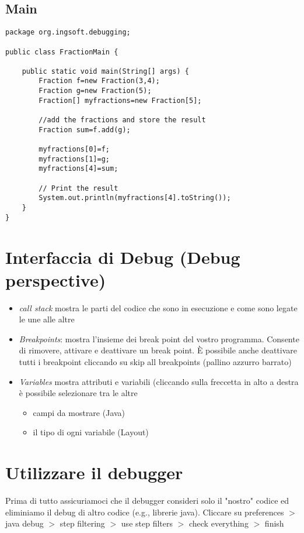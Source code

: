 \documentclass{article}
\begin{document}
\subsection{Main}
\begin{lstlisting}
package org.ingsoft.debugging;

public class FractionMain {

	public static void main(String[] args) {
		Fraction f=new Fraction(3,4);
		Fraction g=new Fraction(5);
		Fraction[] myfractions=new Fraction[5];
		
		//add the fractions and store the result
		Fraction sum=f.add(g);
		
		myfractions[0]=f;
		myfractions[1]=g;
		myfractions[4]=sum;
		
		// Print the result
		System.out.println(myfractions[4].toString());
	}
}
\end{lstlisting}


\section{Interfaccia di Debug (Debug perspective)}
\begin{itemize}
\item \emph{call stack} mostra le parti del codice che sono in esecuzione e come sono legate le une alle altre
\item \emph{Breakpoints}: mostra l'insieme dei break point del vostro programma. Consente di rimovere, attivare e deattivare un break point. \`E possibile anche deattivare tutti i breakpoint cliccando su skip all breakpoints (pallino azzurro barrato)
\item \emph{Variables} mostra attributi e variabili (cliccando sulla freccetta in alto a destra \`e possibile selezionare  tra le altre
\begin{itemize}
\item campi da mostrare (Java)
\item il tipo di ogni variabile (Layout)
\end{itemize}
\end{itemize}


\section{Utilizzare il debugger}
Prima di tutto assicuriamoci che il debugger consideri solo il "nostro" codice ed eliminiamo il  debug di altro codice (e.g., librerie java).
Cliccare su preferences $>$ java debug $>$ step filtering $>$ use step filters $>$ check everything $>$ finish
\end{document}
